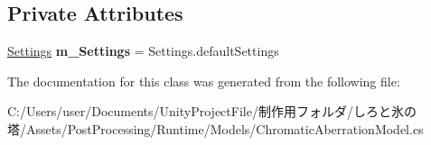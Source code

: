 \subsection*{Private Attributes}
\begin{DoxyCompactItemize}
\item 
\mbox{\label{class_unity_engine_1_1_post_processing_1_1_chromatic_aberration_model_ac0ba212b9b2a0af64a61ac582c3538d2}} 
\hyperlink{struct_unity_engine_1_1_post_processing_1_1_chromatic_aberration_model_1_1_settings}{Settings} {\bfseries m\+\_\+\+Settings} = Settings.\+default\+Settings
\end{DoxyCompactItemize}


The documentation for this class was generated from the following file\+:\begin{DoxyCompactItemize}
\item 
C\+:/\+Users/user/\+Documents/\+Unity\+Project\+File/制作用フォルダ/しろと氷の塔/\+Assets/\+Post\+Processing/\+Runtime/\+Models/Chromatic\+Aberration\+Model.\+cs\end{DoxyCompactItemize}
